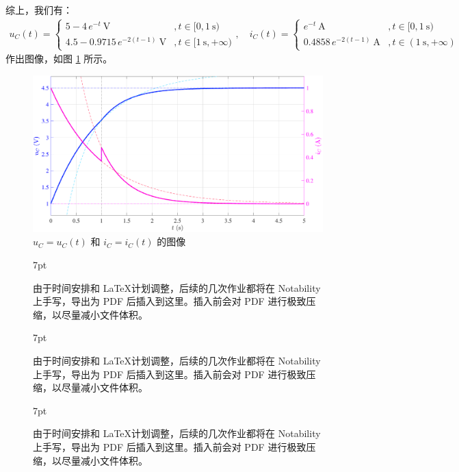 \documentclass[UTF8]{report}
\theoremstyle{MyLineTheoremStyle} %
\theoremstyle{MyBlockTheoremStyle} %
\theoremstyle{MySubsubsectionStyle} %
\newenvironment{graybox}{%
        \def\FrameCommand{%
        \hspace{1pt}%
        {\color{gray}\small \vrule width 2pt}%
        {\color{graybox_color}\vrule width 4pt}%
        \colorbox{graybox_color}%
        }%
        \MakeFramed{\advance\hsize-\width\FrameRestore}%
        \noindent\hspace{-4.55pt}%
        \begin{adjustwidth}{}{7pt}%
        \vspace{2pt}\vspace{2pt}%
        }
        {%
        \vspace{2pt}\end{adjustwidth}\endMakeFramed%
        }
\begin{document}
综上，我们有：
\begin{gather}
\boxed{
    u_C(t) = 
    \begin{cases}
        5 - 4 \,e^{-t} \ \mathrm{V} &, t \in [0, 1 \ \mathrm{s}) \\ 
        4.5 - 0.9715 \,e^{-2(t-1)} \ \mathrm{V} &, t \in [1 \ \mathrm{s}, +\infty)
    \end{cases},\quad 
    i_C(t) =
    \begin{cases}
        e^{-t} \ \mathrm{A} &, t \in [0, 1 \ \mathrm{s}) \\ 
        0.4858 \,e^{-2(t-1)} \ \mathrm{A} &, t \in (1 \ \mathrm{s}, +\infty)
    \end{cases}
}
\end{gather}
作出图像，如图 \ref{9.6 习题集 7-35} 所示。

\begin{figure}[H]\centering
\includegraphics[width=\columnwidth]{assets/9/9.6 3.pdf}
\caption{$u_C = u_C(t)$ 和 $i_C = i_C(t)$ 的图像}\label{9.6 习题集 7-35}
\end{figure}

\clearpage  %
\begin{figure}[b]\centering
    \begin{graybox}
    由于时间安排和 \LaTeX 计划调整，后续的几次作业都将在 Notability 上手写，导出为 PDF 后插入到这里。插入前会对 PDF 进行极致压缩，以尽量减小文件体积。
    \end{graybox}
\end{figure}
\begin{figure}[b]\centering
    \begin{graybox}
    由于时间安排和 \LaTeX 计划调整，后续的几次作业都将在 Notability 上手写，导出为 PDF 后插入到这里。插入前会对 PDF 进行极致压缩，以尽量减小文件体积。
    \end{graybox}
\end{figure}
\begin{figure}[b]\centering
    \begin{graybox}
    由于时间安排和 \LaTeX 计划调整，后续的几次作业都将在 Notability 上手写，导出为 PDF 后插入到这里。插入前会对 PDF 进行极致压缩，以尽量减小文件体积。
    \end{graybox}
\end{figure}
\clearpage
\end{document}
